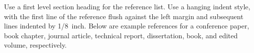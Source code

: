 \documentclass[10pt,letterpaper]{article}
\begin{document}
Use a first level section heading for the reference list. Use a
hanging indent style, with the first line of the reference flush
against the left margin and subsequent lines indented by 1/8~inch.
Below are example references for a conference paper, book chapter,
journal article, technical report, dissertation, book, and edited
volume, respectively.

\nocite{ChalnickBillman1988a}
\nocite{Feigenbaum1963a}
\nocite{Hill1983a}
\nocite{OhlssonLangley1985a}
\nocite{Lewis1978a}
\nocite{NewellSimon1972a}
\nocite{ShragerLangley1990a}




\setlength{\bibleftmargin}{.125in}
\setlength{\bibindent}{-\bibleftmargin}


\end{document}
